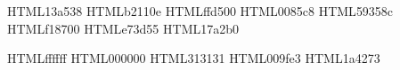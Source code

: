 \usepackage[usenames,dvipsnames,svgnames,table]{xcolor}

\definecolor{THDGreen}      {HTML}{13a538}%
\definecolor{THDDarkRed}    {HTML}{b2110e}%
\definecolor{THDYellow}     {HTML}{ffd500}%
\definecolor{THDStrongBlue} {HTML}{0085c8}%
\definecolor{THDPurple}     {HTML}{59358c}%
\definecolor{THDOrange}     {HTML}{f18700}%
\definecolor{THDBrightRed}  {HTML}{e73d55}%
\definecolor{THDCyan}       {HTML}{17a2b0}%

\definecolor{THDWhite}      {HTML}{ffffff}
\definecolor{THDBlack}      {HTML}{000000}
\definecolor{THDGrey}       {HTML}{313131}
\definecolor{THDDonauBlau}  {HTML}{009fe3}%
\definecolor{THDBlau}       {HTML}{1a4273}%

\newcommand\HighlightColor{\color{HighlightColor}}
